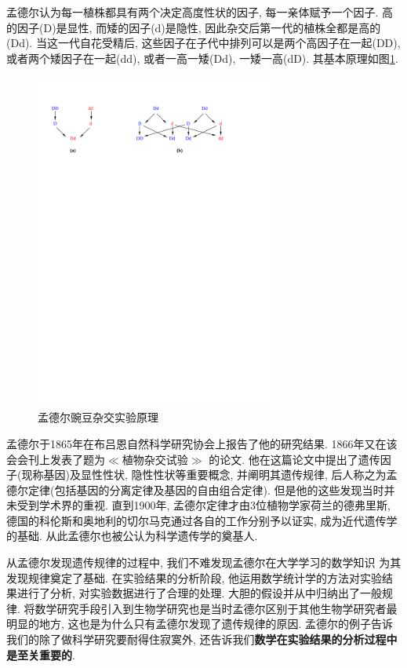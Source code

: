 \documentclass[11pt,a4paper,boxed]{caspset}
\begin{document}
孟德尔认为每一植株都具有两个决定高度性状的因子, 每一亲体赋予一个因子. 高的因子(D)是显性, 而矮的因子(d)是隐性, 因此杂交后第一代的植株全都是高的(Dd). 当这一代自花受精后, 这些因子在子代中排列可以是两个高因子在一起(DD), 或者两个矮因子在一起(dd), 或者一高一矮(Dd), 一矮一高(dD). 其基本原理如图\ref{meEx}.
\begin{figure}[!htb]
\centering
\includegraphics[width = 0.7\textwidth]{./figures/meEx.pdf}
\caption{\label{meEx}孟德尔豌豆杂交实验原理}
\end{figure}
孟德尔于1865年在布吕恩自然科学研究协会上报告了他的研究结果. 1866年又在该会会刊上发表了题为$\ll$植物杂交试验$\gg$ 的论文. 他在这篇论文中提出了遗传因子(现称基因)及显性性状, 隐性性状等重要概念, 并阐明其遗传规律, 后人称之为孟德尔定律(包括基因的分离定律及基因的自由组合定律). 但是他的这些发现当时并未受到学术界的重视. 直到1900年, 孟德尔定律才由3位植物学家荷兰的德弗里斯, 德国的科伦斯和奥地利的切尔马克通过各自的工作分别予以证实, 成为近代遗传学的基础. 从此孟德尔也被公认为科学遗传学的奠基人.

从孟德尔发现遗传规律的过程中, 我们不难发现孟德尔在大学学习的数学知识
为其发现规律奠定了基础. 在实验结果的分析阶段, 他运用数学统计学的方法对实验结果进行了分析, 对实验数据进行了合理的处理. 大胆的假设并从中归纳出了一般规律. 将数学研究手段引入到生物学研究也是当时孟德尔区别于其他生物学研究者最明显的地方, 这也是为什么只有孟德尔发现了遗传规律的原因.
孟德尔的例子告诉我们的除了做科学研究要耐得住寂寞外, 还告诉我们\textbf{数学在实验结果的分析过程中是至关重要的}.
\end{document}
